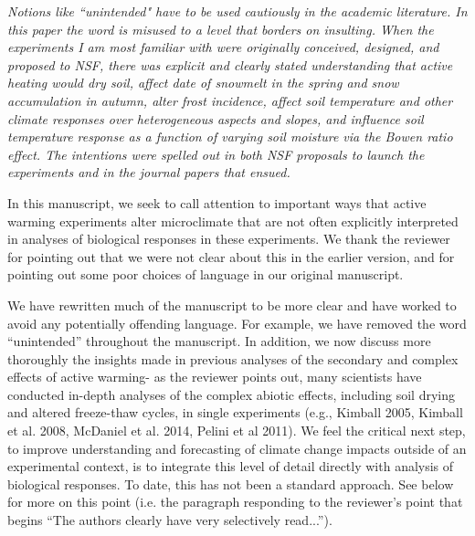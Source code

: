 \documentclass[11pt,a4paper]{letter}
\begin{document}
\begin{letter}{}
\emph{Notions like ``unintended" have to be used cautiously in the academic literature.  In this paper the word is misused to a level that borders on insulting.  When the experiments I am most familiar with were originally conceived, designed, and proposed to NSF, there was explicit and clearly stated understanding that active heating would dry soil, affect date of snowmelt in the spring and snow accumulation in autumn, alter frost incidence, affect soil temperature and other climate responses over heterogeneous aspects and slopes, and influence soil temperature response as a function of varying soil moisture via the Bowen ratio effect.  The intentions were spelled out in both NSF proposals to launch the experiments and in the journal papers that ensued.}

In this manuscript, we seek to call attention to important ways that active warming experiments alter microclimate that are not often explicitly interpreted in analyses of biological responses in these experiments. We thank the reviewer for pointing out that we were not clear about this in the earlier version, and for pointing out some poor choices of language in our original manuscript. 

We have rewritten much of the manuscript to be more clear and have worked to avoid any potentially offending language. For example, we have removed the word ``unintended'' throughout the manuscript. In addition, we now discuss more thoroughly the insights made in previous analyses of the secondary and complex effects of active warming- as the reviewer points out, many scientists have conducted in-depth analyses of the complex abiotic effects, including soil drying and altered freeze-thaw cycles, in single experiments (e.g., Kimball 2005, Kimball et al. 2008, McDaniel et al. 2014, Pelini et al 2011). We feel the critical next step, to improve understanding and  forecasting of climate change impacts outside of an experimental context, is to integrate this level of detail directly with analysis of biological responses. To date, this has not been a standard approach. See below for more on this point (i.e. the paragraph responding to the reviewer's point that begins ``The authors clearly have very selectively read...'').


\end{letter}
\end{document}
